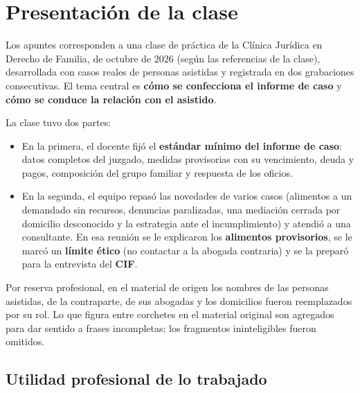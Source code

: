 \documentclass[12pt,oneside]{book}
\begin{document}

\chapter*{Presentación de la clase}

Los apuntes corresponden a una clase de práctica de la Clínica Jurídica en Derecho de Familia, de octubre de 2026 (según las referencias de la clase), desarrollada con casos reales de personas asistidas y registrada en dos grabaciones consecutivas. El tema central es \textbf{cómo se confecciona el informe de caso} y \textbf{cómo se conduce la relación con el asistido}.

La clase tuvo dos partes:

\begin{itemize}
    \item En la primera, el docente fijó el \textbf{estándar mínimo del informe de caso}: datos completos del juzgado, medidas provisorias con su vencimiento, deuda y pagos, composición del grupo familiar y respuesta de los oficios.
    \item En la segunda, el equipo repasó las novedades de varios casos (alimentos a un demandado sin recursos, denuncias paralizadas, una mediación cerrada por domicilio desconocido y la estrategia ante el incumplimiento) y atendió a una consultante. En esa reunión se le explicaron los \textbf{alimentos provisorios}, se le marcó un \textbf{límite ético} (no contactar a la abogada contraria) y se la preparó para la entrevista del \textbf{CIF}.
\end{itemize}

\begin{note}
Por reserva profesional, en el material de origen los nombres de las personas asistidas, de la contraparte, de sus abogadas y los domicilios fueron reemplazados por su rol. Lo que figura entre corchetes en el material original son agregados para dar sentido a frases incompletas; los fragmentos ininteligibles fueron omitidos.
\end{note}

\section*{Utilidad profesional de lo trabajado}
\end{document}
